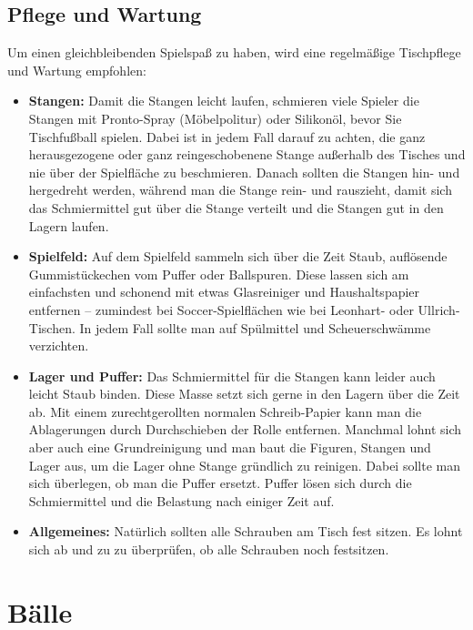 \subsection{Pflege und Wartung}
\label{tisch:tisch:wartung}

Um einen gleichbleibenden Spielspaß zu haben, wird eine regelmäßige Tischpflege und Wartung empfohlen:
\begin{itemize}  
\item {\bf Stangen:} Damit die Stangen leicht laufen, schmieren viele Spieler die Stangen mit Pronto-Spray (Möbelpolitur) oder Silikonöl, bevor Sie Tischfußball spielen. Dabei ist in jedem Fall darauf zu achten, die ganz herausgezogene oder ganz reingeschobenene Stange außerhalb des Tisches und nie über der Spielfläche zu beschmieren. Danach sollten die Stangen hin- und hergedreht werden, während man die Stange rein- und rauszieht, damit sich das Schmiermittel gut über die Stange verteilt  und die Stangen gut in den Lagern laufen.
\item {\bf Spielfeld:} Auf dem Spielfeld sammeln sich über die Zeit Staub, auflösende Gummistückechen vom Puffer oder Ballspuren. Diese lassen sich am einfachsten und schonend mit etwas Glasreiniger und Haushaltspapier entfernen -- zumindest bei Soccer-Spielflächen wie bei Leonhart- oder Ullrich-Tischen. In jedem Fall sollte man auf Spülmittel und Scheuerschwämme verzichten. 
\item {\bf Lager und Puffer:} Das Schmiermittel für die Stangen kann leider auch leicht Staub binden. Diese Masse setzt sich gerne in den Lagern über die Zeit ab. Mit einem zurechtgerollten normalen Schreib-Papier kann man die Ablagerungen durch Durchschieben der Rolle entfernen. Manchmal lohnt sich aber auch eine Grundreinigung und man baut die Figuren, Stangen und Lager aus, um die Lager ohne Stange gründlich zu reinigen. Dabei sollte man sich überlegen, ob man die Puffer ersetzt. Puffer lösen sich durch die Schmiermittel und die Belastung nach einiger Zeit auf.    
\item {\bf Allgemeines:} Natürlich sollten alle Schrauben am Tisch fest sitzen. Es lohnt sich ab und zu zu überprüfen, ob alle Schrauben noch festsitzen.  
\end{itemize}  


\section{Bälle}
\label{tisch:baelle}

